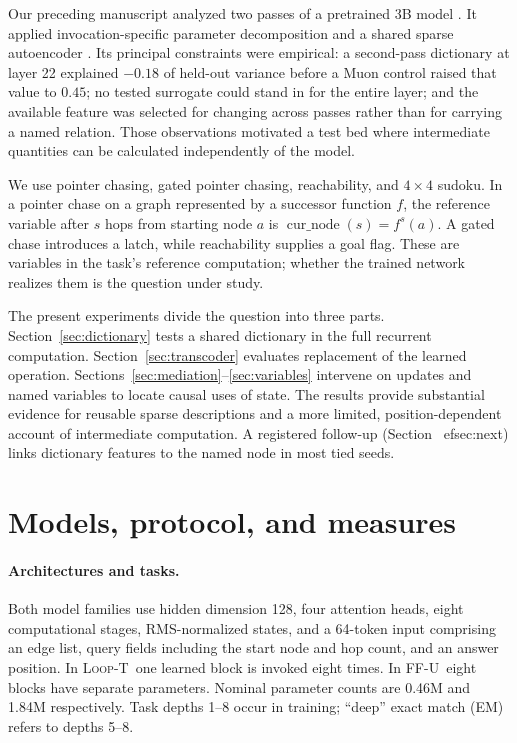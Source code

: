 \documentclass[10pt,letterpaper]{article}
\newcommand{\LoopT}{\textsc{Loop-T}}
\newcommand{\FFU}{\textsc{FF-U}}
\newcommand{\cur}{\operatorname{cur\_node}}
\begin{document}
Our preceding manuscript analyzed two passes of a pretrained 3B model \cite{dugan1}. It applied invocation-specific parameter decomposition \cite{braun} and a shared sparse autoencoder \cite{bricken}. Its principal constraints were empirical: a second-pass dictionary at layer 22 explained $-0.18$ of held-out variance before a Muon control raised that value to $0.45$; no tested surrogate could stand in for the entire layer; and the available feature was selected for changing across passes rather than for carrying a named relation. Those observations motivated a test bed where intermediate quantities can be calculated independently of the model.

We use pointer chasing, gated pointer chasing, reachability, and $4\times4$ sudoku. In a pointer chase on a graph represented by a successor function $f$, the reference variable after $s$ hops from starting node $a$ is $\cur(s)=f^s(a)$. A gated chase introduces a latch, while reachability supplies a goal flag. These are variables in the task's reference computation; whether the trained network realizes them is the question under study.

The present experiments divide the question into three parts. Section~\ref{sec:dictionary} tests a shared dictionary in the full recurrent computation. Section~\ref{sec:transcoder} evaluates replacement of the learned operation. Sections~\ref{sec:mediation}--\ref{sec:variables} intervene on updates and named variables to locate causal uses of state. The results provide substantial evidence for reusable sparse descriptions and a more limited, position-dependent account of intermediate computation. A registered follow-up (Section~
ef{sec:next}) links dictionary features to the named node in most tied seeds.

\section{Models, protocol, and measures}\label{sec:setup}
\paragraph{Architectures and tasks.} Both model families use hidden dimension 128, four attention heads, eight computational stages, RMS-normalized states, and a 64-token input comprising an edge list, query fields including the start node and hop count, and an answer position. In \LoopT\ one learned block is invoked eight times. In \FFU\ eight blocks have separate parameters. Nominal parameter counts are 0.46M and 1.84M respectively. Task depths 1--8 occur in training; ``deep'' exact match (EM) refers to depths 5--8.
\end{document}
